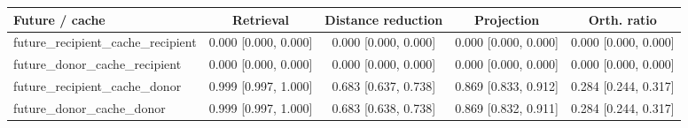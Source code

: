 \begin{tabular}{lcccc}
\toprule
Future / cache & Retrieval & Distance reduction & Projection & Orth. ratio \\
\midrule
future\_recipient\_cache\_recipient & 0.000 [0.000, 0.000] & 0.000 [0.000, 0.000] & 0.000 [0.000, 0.000] & 0.000 [0.000, 0.000] \\
future\_donor\_cache\_recipient & 0.000 [0.000, 0.000] & 0.000 [0.000, 0.000] & 0.000 [0.000, 0.000] & 0.000 [0.000, 0.000] \\
future\_recipient\_cache\_donor & 0.999 [0.997, 1.000] & 0.683 [0.637, 0.738] & 0.869 [0.833, 0.912] & 0.284 [0.244, 0.317] \\
future\_donor\_cache\_donor & 0.999 [0.997, 1.000] & 0.683 [0.638, 0.738] & 0.869 [0.832, 0.911] & 0.284 [0.244, 0.317] \\
\bottomrule
\end{tabular}

